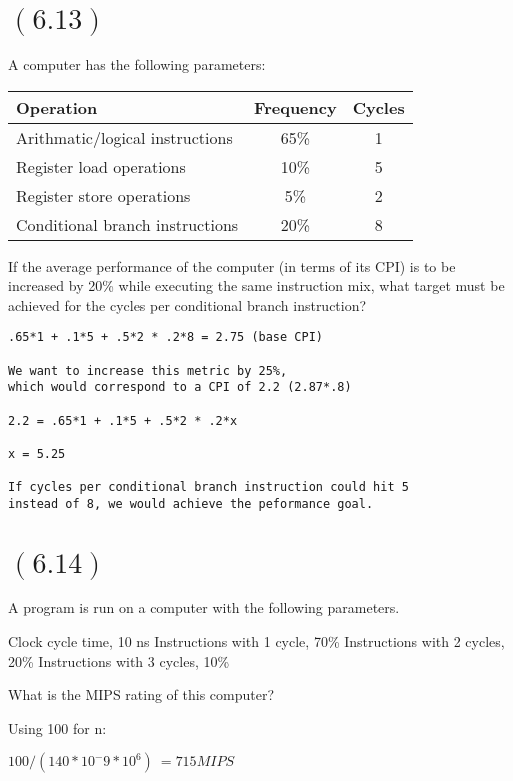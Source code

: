\documentclass[letterpaper,12pt,titlepage]{article}
\begin{document}
\section*{$(6.13)$} A computer has the following parameters:\\
\begin{center}
\begin{tabular}{l | c | c}
\textbf{Operation} & \textbf{Frequency} & \textbf{Cycles}\\ \hline
Arithmatic/logical instructions& 65\% & 1\\
Register load operations& 10\% & 5\\
Register store operations& 5\% & 2\\
Conditional branch instructions& 20\% & 8 \\
\end{tabular}
\end{center}

If the average performance of the computer (in terms of its CPI) is to be increased by 20\% while executing the same instruction mix, what target must be achieved for the cycles per conditional branch instruction?

\begin{mdframed}[style=MyFrame]
\begin{verbatim}
.65*1 + .1*5 + .5*2 * .2*8 = 2.75 (base CPI)

We want to increase this metric by 25%,
which would correspond to a CPI of 2.2 (2.87*.8)

2.2 = .65*1 + .1*5 + .5*2 * .2*x

x = 5.25

If cycles per conditional branch instruction could hit 5
instead of 8, we would achieve the peformance goal. 
\end{verbatim}
\end{mdframed}

\section*{$(6.14)$} A program is run on a computer with the following parameters.

Clock cycle time, 10 ns
Instructions with 1 cycle, 70\%
Instructions with 2 cycles, 20\%
Instructions with 3 cycles, 10\%

What is the MIPS rating of this computer?

\begin{mdframed}[style=MyFrame]
Using 100 for n:

$ 100 / (140 * 10^-9 * 10 ^ 6) ~= 715 MIPS $
\end{mdframed}
\newpage
\end{document}
